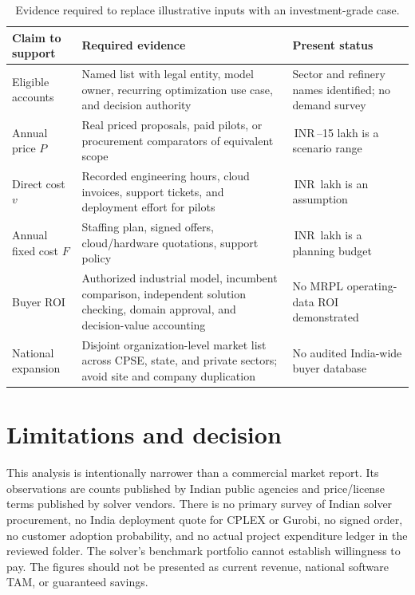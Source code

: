 \documentclass[11pt,a4paper]{article}
\newcommand{\inr}{\ifmmode\text{INR}\,\else INR\,\fi}
\newcommand{\lac}{\ifmmode\,\text{lakh}\else\,lakh\fi}
\begin{document}
\begin{table}[htbp]
\centering
\caption{Evidence required to replace illustrative inputs with an investment-grade case.}
\label{tab:gates}
\small
\begin{tabularx}{\textwidth}{@{}p{31mm}X p{36mm}@{}}
\toprule
Claim to support & Required evidence & Present status\\
\midrule
Eligible accounts & Named list with legal entity, model owner, recurring optimization use case, and decision authority & Sector and refinery names identified; no demand survey\\
Annual price \(P\) & Real priced proposals, paid pilots, or procurement comparators of equivalent scope & \inr5--15\lac{} is a scenario range\\
Direct cost \(v\) & Recorded engineering hours, cloud invoices, support tickets, and deployment effort for pilots & \inr3\lac{} is an assumption\\
Annual fixed cost \(F\) & Staffing plan, signed offers, cloud/hardware quotations, support policy & \inr60\lac{} is a planning budget\\
Buyer ROI & Authorized industrial model, incumbent comparison, independent solution checking, domain approval, and decision-value accounting & No MRPL operating-data ROI demonstrated\\
National expansion & Disjoint organization-level market list across CPSE, state, and private sectors; avoid site and company duplication & No audited India-wide buyer database\\
\bottomrule
\end{tabularx}
\end{table}

\section{Limitations and decision}

This analysis is intentionally narrower than a commercial market report. Its observations are counts published by Indian public agencies and price/license terms published by solver vendors. There is no primary survey of Indian solver procurement, no India deployment quote for CPLEX or Gurobi, no signed order, no customer adoption probability, and no actual project expenditure ledger in the reviewed folder. The solver's benchmark portfolio cannot establish willingness to pay. The figures should not be presented as current revenue, national software TAM, or guaranteed savings.
\end{document}
